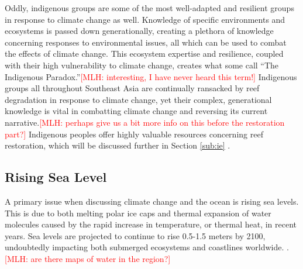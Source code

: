 \documentclass{book}\usepackage{knitr}
\newcommand{\red}[1]{\textcolor{red}{[MLH: #1]}}
\begin{document}
\begin{knitrout}
\begin{kframe}
{	Oddly, indigenous groups are some of the most well-adapted and resilient groups in response to climate change as well. Knowledge of specific environments and ecosystems is passed down generationally, creating a plethora of knowledge concerning responses to environmental issues, all which can be used to combat the effects of climate change. This ecosystem expertise and resilience, coupled with their high vulnerability to climate change, creates what some call ``The Indigenous Paradox.''\red{interesting, I have never heard this term!} Indigenous groups all throughout Southeast Asia are continually ransacked by reef degradation in response to climate change, yet their complex, generational knowledge is vital in combatting climate change and reversing its current narrative.\red{perhaps give us a bit more info on this before the restoration part?} Indigenous peoples offer highly valuable resources concerning reef restoration, which will be discussed further in Section \ref{sub:ie} \citep{13772149520190801}.

\subsection{Rising Sea Level}

A primary issue when discussing climate change and the ocean is rising sea levels. This is due to both melting polar ice caps and thermal expansion of water molecules caused by the rapid increase in temperature, or thermal heat, in recent years. Sea levels are projected to continue to rise 0.5-1.5 meters by 2100, undoubtedly impacting both submerged ecosystems and coastlines worldwide. \citep{coralreefalliance_2021}.\red{are there maps of water in the region?}

}
\end{kframe}
\end{knitrout}
\end{document}
